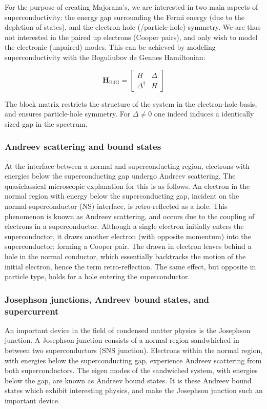 		For the purpose of creating Majorana's, we are interested in two main aspects of superconductivity: the energy gap surrounding the Fermi energy (due to the depletion of states), and the electron-hole (/particle-hole) symmetry.
		We are thus not interested in the paired up electrons (Cooper pairs), and only wish to model the electronic (unpaired) modes.
		This can be achieved by modeling superconductivity with the Boguliubov de Gennes Hamiltonian:
		
		\begin{equation}
		\mathbf{H}_\text{BdG} = \begin{bmatrix} H & \Delta \\ \Delta^\dagger & H \end{bmatrix}
		\end{equation}

		The block matrix restricts the structure of the system in the electron-hole basis, and ensures particle-hole symmetry.
		For $\Delta \neq 0$ one indeed induces a identically sized gap in the spectrum.

		\subsubsection{Andreev scattering and bound states}
			At the interface between a normal and superconducting region, electrons with energies below the superconducting gap undergo Andreev scattering.
			The quasiclassical microscopic explanation for this is as follows.
			An electron in the normal region with energy below the superconducting gap, incident on the normal-superconductor (NS) interface, is retro-reflected as a hole.
			This phenomenon is known as Andreev scattering, and occurs due to the coupling of electrons in a superconductor.
			Although a single electron initially enters the superconductor, it draws another electron (with opposite momentum) into the superconductor: forming a Cooper pair.
			The drawn in electron leaves behind a hole in the normal conductor, which essentially backtracks the motion of the initial electron, hence the term retro-reflection.
			The same effect, but opposite in particle type, holds for a hole entering the superconductor.


		\subsubsection{Josephson junctions, Andreev bound states, and supercurrent}
			An important device in the field of condensed matter physics is the Josephson junction.
			A Josephson junction consists of a normal region sandwhiched in between two superconductors (SNS junction).
			Electrons within the normal region, with energies below the superconducting gap, experience Andreev scattering from both superconductors.
			The eigen modes of the sandwiched system, with energies below the gap, are known as Andreev bound states.
			It is these Andreev bound states which exhibit interesting physics, and make the Josephson junction such an important device.

